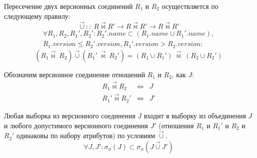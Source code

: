 \begin{definition}
	\label{def:union}
	Пересечение двух версионных соединений $R_1$ и $R_2$ осуществляется по следующему правилу:
	\begin{equation*}
		\overrightarrow{\cup} ::\ R\overrightarrow{\bowtie}R' \rightarrow R\overrightarrow{\bowtie}R' \rightarrow R\overrightarrow{\bowtie}R'
	\end{equation*}
	\begin{multline}
		\forall R_1,R_2,R_1',R_2': R_2'.name \subset (R_1.name \cup R_1'.name),\\
		R_1.version \leq R_2'.version, R_1'.version > R_2.version:
	\end{multline}
	\begin{equation}
		(R_1\overrightarrow{\bowtie}\ R_2) \overrightarrow{\cup} (R_1'\ \overrightarrow{\bowtie}\ R_2') = (R_1 \cup R_1')\ \overrightarrow{\bowtie}\ (R_2 \cup R_2')
	\end{equation}
\end{definition}

\indent Обозначим версионное соединение отношений $R_1$ и $R_2$, как $J$:
\begin{eqnarray*}
	R_1 \overrightarrow{\bowtie} R_2 & \Leftrightarrow & J \\
	R_1' \overrightarrow{\bowtie} R_2' & \Leftrightarrow & J'
\end{eqnarray*}

\begin{theorem}
	\label{th:th1}
	Любая выборка из версионного соединения $J$ входит в выборку из объединения $J$ и любого допустимого версионного соединения $J'$ (отношения $R_1$ и $R_1'$ и $R_2$ и $R_2'$ одинаковы по набору атрибутов) по условиям $\overrightarrow{\cup}$.
	\begin{equation}
		\forall J, J': \sigma_\phi(J) \subset \sigma_\phi(J \overrightarrow{\cup} J')
	\end{equation}
\end{theorem}

